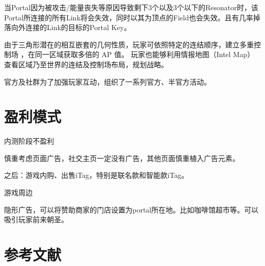 \documentclass[UTF8]{ctexart}
\begin{document}
\begin{tcolorbox}
    当Portal因为被攻击/能量丧失等原因导致剩下3个以及3个以下的Resonator时，该Portal所连接的所有Link将会失效，同时以其为顶点的Field也会失效。且有几率掉落向外连接的Link的目标的Portal Key。

    由于三角形潜在的相互嵌套的几何性质，玩家可依照特定的连结顺序，建立多重控制场 ，在同一区域获取多倍的 AP 值。 玩家也能够利用情报地图（Intel Map）查看区域乃至世界的连结及控制场布局，规划战略。\cite{wiki:Ingress}
\end{tcolorbox}


官方及社群为了加强玩家互动，组织了一系列官方、半官方活动。

\section{盈利模式}

内测阶段不盈利

慎重考虑页面广告，社交主页一定没有广告，其他页面慎重植入广告元素。

之后：游戏内购、出售iTag，特别是联名款和智能款iTag。

游戏周边

隐形广告，可以将赞助商家的门店设置为portal所在地。比如咖啡馆超市等。可以吸引玩家前来朝圣。

\section{参考文献}



\end{document}
